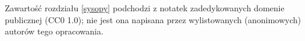 \documentclass[12pt, a4paper, openany]{book} %
\begin{document}
\frontmatter


\tableofcontents


Zawartość rozdziału \ref{sysopy} podchodzi z notatek zadedykowanych domenie publicznej (CC0 1.0); nie jest ona napisana przez wylistowanych (anonimowych) autorów tego opracowania.

\mainmatter

%

%
%

%
%
%
%


%
%
%
%

%
%


%
\end{document}
